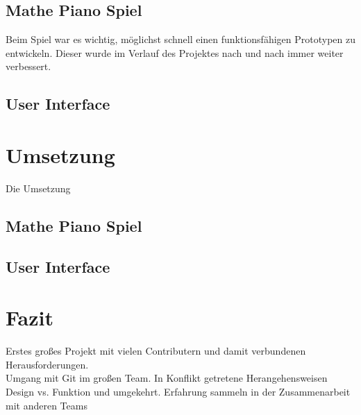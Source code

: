 \subsection{Mathe Piano Spiel}
Beim Spiel war es wichtig, möglichst schnell einen funktionsfähigen Prototypen zu entwickeln. Dieser wurde im Verlauf des Projektes nach und nach immer weiter verbessert.




\subsection{User Interface}

\section{Umsetzung}
Die Umsetzung 
\subsection{Mathe Piano Spiel}


\subsection{User Interface}


\section{Fazit}
Erstes großes Projekt mit vielen Contributern und damit verbundenen Herausforderungen.\\
Umgang mit Git im großen Team.
In Konflikt getretene Herangehensweisen Design vs. Funktion und umgekehrt.
Erfahrung sammeln in der Zusammenarbeit mit anderen Teams %